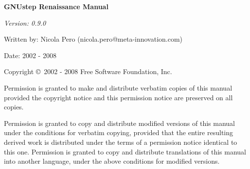%
%
%
\begin{titlepage}
\begin{flushleft}
{\phantom{begin page}}
\vskip6cm

{\LARGE\bf GNUstep Renaissance Manual\par}

\vskip1cm

{\sl Version: 0.9.0

Written by:  Nicola Pero (nicola.pero@meta-innovation.com)

Date: 2002 - 2008}
\end{flushleft}

\vskip3cm

{\sc Copyright \copyright\ 2002 - 2008 Free Software Foundation, Inc.}

Permission is granted to make and distribute verbatim copies of this
manual provided the copyright notice and this permission notice are
preserved on all copies.

Permission is granted to copy and distribute modified versions of this
manual under the conditions for verbatim copying, provided that the
entire resulting derived work is distributed under the terms of a
permission notice identical to this one.  Permission is granted to
copy and distribute translations of this manual into another language,
under the above conditions for modified versions.

\end{titlepage}





